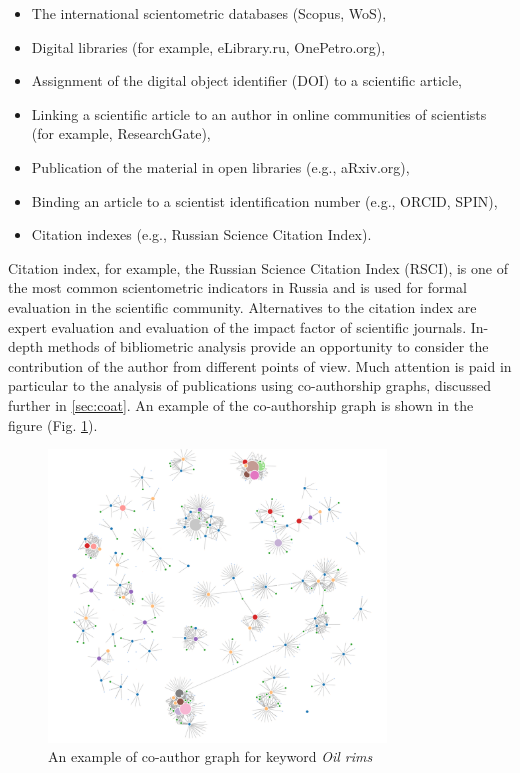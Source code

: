\documentclass[12pt]{report}
\theoremstyle{definition}
\providecommand{\tightlist}{%
	\setlength{\itemsep}{0pt}\setlength{\parskip}{0pt}}
\begin{document}
\begin{itemize}
	\tightlist
	\item The international scientometric databases (Scopus, WoS), 
	\item Digital libraries (for example, eLibrary.ru, OnePetro.org),
	\item Assignment of the digital object identifier (DOI) to a scientific article, 
	\item Linking a scientific article to an author in online communities of scientists (for example, ResearchGate),
	\item Publication of the material in open libraries (e.g., aRxiv.org),
	\item Binding an article to a scientist identification number (e.g., ORCID, SPIN),
	\item Citation indexes (e.g., Russian Science Citation Index).
\end{itemize}

Citation index, for example, the Russian Science Citation Index (RSCI), is one of the most common scientometric indicators in Russia and is used for formal evaluation in the scientific community.
Alternatives to the citation index are expert evaluation and evaluation of the impact factor of scientific journals.
In-depth methods of bibliometric analysis provide an opportunity to consider the contribution of the author from different points of view.
Much attention is paid in particular to the analysis of publications using co-authorship graphs, discussed further in \ref{sec:coat}. 
An example of the co-authorship graph is shown in the figure (Fig. \ref{fig:om3}).

\begin{figure}[ht]
	\centering
	\includegraphics[width=0.8\textwidth]{om3}
	\caption{An example of co-author graph for keyword \textit{Oil rims}}
	\label{fig:om3}
\end{figure}  
\end{document}
